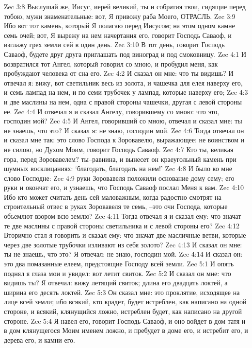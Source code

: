 Zec 3:8  Выслушай же, Иисус, иерей великий, ты и собратия твои, сидящие перед тобою, мужи знаменательные: вот, Я привожу раба Моего, ОТРАСЛЬ.
Zec 3:9  Ибо вот тот камень, который Я полагаю перед Иисусом; на этом одном камне семь очей; вот, Я вырежу на нем начертания его, говорит Господь Саваоф, и изглажу грех земли сей в один день.
Zec 3:10  В тот день, говорит Господь Саваоф, будете друг друга приглашать под виноград и под смоковницу.
Zec 4:1  И возвратился тот Ангел, который говорил со мною, и пробудил меня, как пробуждают человека от сна его.
Zec 4:2  И сказал он мне: что ты видишь? И отвечал я: вижу, вот светильник весь из золота, и чашечка для елея наверху его, и семь лампад на нем, и по семи трубочек у лампад, которые наверху его;
Zec 4:3  и две маслины на нем, одна с правой стороны чашечки, другая с левой стороны ее.
Zec 4:4  И отвечал я и сказал Ангелу, говорившему со мною: что это, господин мой?
Zec 4:5  И Ангел, говоривший со мною, отвечал и сказал мне: ты не знаешь, что это? И сказал я: не знаю, господин мой.
Zec 4:6  Тогда отвечал он и сказал мне так: это слово Господа к Зоровавелю, выражающее: не воинством и не силою, но Духом Моим, говорит Господь Саваоф.
Zec 4:7  Кто ты, великая гора, перед Зоровавелем? ты--равнина, и вынесет он краеугольный камень при шумных восклицаниях: `благодать, благодать на нем!'
Zec 4:8  И было ко мне слово Господне:
Zec 4:9  руки Зоровавеля положили основание дому сему; его руки и окончат его, и узнаешь, что Господь Саваоф послал Меня к вам.
Zec 4:10  Ибо кто может считать день сей маловажным, когда радостно смотрят на строительный отвес в руках Зоровавеля те семь, --это очи Господа, которые объемлют взором всю землю?
Zec 4:11  Тогда отвечал я и сказал ему: что значат те две маслины с правой стороны светильника и с левой стороны его?
Zec 4:12  Вторично стал я говорить и сказал ему: что значат две масличные ветви, которые через две золотые трубочки изливают из себя золото?
Zec 4:13  И сказал он мне: ты не знаешь, что это? Я отвечал: не знаю, господин мой.
Zec 4:14  И сказал он: это два помазанные елеем, предстоящие Господу всей земли.
Zec 5:1  И опять поднял я глаза мои и увидел: вот летит свиток.
Zec 5:2  И сказал он мне: что видишь ты? Я отвечал: вижу летящий свиток; длина его двадцать локтей, а ширина его десять локтей.
Zec 5:3  Он сказал мне: это проклятие, исходящее на лице всей земли; ибо всякий, кто крадет, будет истреблен, как написано на одной стороне, и всякий, клянущийся ложно, истреблен будет, как написано на другой стороне.
Zec 5:4  Я навел его, говорит Господь Саваоф, и оно войдет в дом татя и в дом клянущегося Моим именем ложно, и пребудет в доме его, и истребит его, и дерева его, и камни его.
